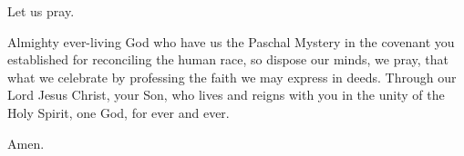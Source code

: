 \pr Let us pray.

\pr Almighty ever-living God who have us the Paschal Mystery in the covenant you established for reconciling the human race, so dispose our minds, we pray, that what we celebrate by professing the faith we may express in deeds. Through our Lord Jesus Christ, your Son, who lives and reigns with you in the unity of the Holy Spirit, one God, for ever and ever.

\be Amen.